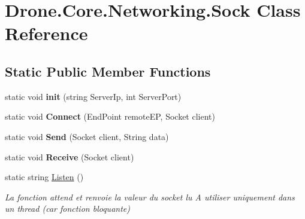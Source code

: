 \hypertarget{class_drone_1_1_core_1_1_networking_1_1_sock}{}\section{Drone.\+Core.\+Networking.\+Sock Class Reference}
\label{class_drone_1_1_core_1_1_networking_1_1_sock}
\subsection*{Static Public Member Functions}
\begin{DoxyCompactItemize}
\item 
\hypertarget{class_drone_1_1_core_1_1_networking_1_1_sock_adb2eab72fbe21cd63c971cca79afeb5e}{}static void {\bfseries init} (string Server\+Ip, int Server\+Port)\label{class_drone_1_1_core_1_1_networking_1_1_sock_adb2eab72fbe21cd63c971cca79afeb5e}

\item 
\hypertarget{class_drone_1_1_core_1_1_networking_1_1_sock_aef86faf1c31761b93eacd231645daa11}{}static void {\bfseries Connect} (End\+Point remote\+E\+P, Socket client)\label{class_drone_1_1_core_1_1_networking_1_1_sock_aef86faf1c31761b93eacd231645daa11}

\item 
\hypertarget{class_drone_1_1_core_1_1_networking_1_1_sock_afee8d5bda70b7ec2ff2051dcceb85c78}{}static void {\bfseries Send} (Socket client, String data)\label{class_drone_1_1_core_1_1_networking_1_1_sock_afee8d5bda70b7ec2ff2051dcceb85c78}

\item 
\hypertarget{class_drone_1_1_core_1_1_networking_1_1_sock_ae5e8d8991d2f1e02c02b67a13a74ed23}{}static void {\bfseries Receive} (Socket client)\label{class_drone_1_1_core_1_1_networking_1_1_sock_ae5e8d8991d2f1e02c02b67a13a74ed23}

\item 
static string \hyperlink{class_drone_1_1_core_1_1_networking_1_1_sock_aee851b4daec2959232b320286e54dde5}{Listen} ()
\begin{DoxyCompactList}\small\item\em La fonction attend et renvoie la valeur du socket lu A utiliser uniquement dans un thread (car fonction bloquante) \end{DoxyCompactList}\end{DoxyCompactItemize}
